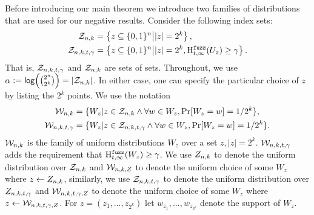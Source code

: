 
\label{sec:family}
Before introducing our main theorem we introduce two families of distributions that are used for our negative results.  Consider the following index sets:
\begin{align*}
\mathcal{Z}_{n,k} &=\left\{z \subseteq \{0, 1\}^n\middle|  |z| = 2^k\right\},\\
\mathcal{Z}_{n,k,t,\gamma} &= \left\{z \subseteq \{0, 1\}^n\middle| |z| = 2^k,\mathrm{H}^{\mathtt{fuzz}}_{t,\infty}(U_z) \ge \gamma\right\}.
\end{align*}
That is, $\mathcal{Z}_{n,k,t,\gamma}$ and $\mathcal{Z}_{n,k}$ are sets of sets.  Throughout, we use $\alpha:= \mathsf{log}\!\left({2^n\choose 2^k}\right) = |\mathcal{Z}_{n,k}|$. In either case, one can specify the particular choice of $z$ by listing the $2^k$ points.  %
We use the notation 
\begin{align*}
\mathcal{W}_{n,k} &=\{W_z | z \in \mathcal{Z}_{n,k}  \wedge \forall w \in W_z, \Pr[W_z=w]=1/2^k\},\\
\mathcal{W}_{n,k,t,\gamma} &= \{W_z | z\in \mathcal{Z}_{n,k,t,\gamma} \wedge \forall w \in W_z, \Pr[W_z=w]=1/2^k\}.
\end{align*}
$\mathcal{W}_{n,k}$ is the family of uniform distributions $W_z$ over a set $z, |z|=2^k$.
$\mathcal{W}_{n,k,t,\gamma}$ adds the requirement that $\mathrm{H}^{\mathtt{fuzz}}_{t,\infty}(W_z)\ge\gamma$. We use $Z_{n,k}$ to denote the uniform distribution over $\mathcal{Z}_{n,k}$ and $\mathcal{W}_{n,k, Z}$ to denote the uniform choice of some $W_z$ where $z\leftarrow Z_{n,k}$, similarly, we use $\mathcal{Z}_{n,k,t,\gamma}$ to denote the uniform distribution over $Z_{n,k,t,\gamma}$ and $\mathcal{W}_{n,k,t,\gamma, Z}$ to denote the uniform choice of some $W_z$ where $z\leftarrow \mathcal{W}_{n,k,t,\gamma, Z}$. For $z=(z_1,..., z_{2^k})$ let $w_{z_1},..., w_{z_{2^k}}$ denote the support of $W_z$.